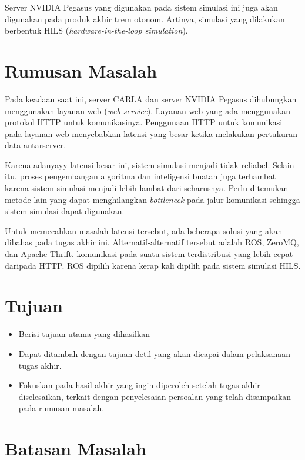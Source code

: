 Server NVIDIA Pegasus yang digunakan pada sistem simulasi ini juga akan
digunakan pada produk akhir trem otonom. Artinya, simulasi yang dilakukan
berbentuk HILS (\textit{hardware-in-the-loop simulation}).

\section{Rumusan Masalah}

Pada keadaan saat ini, server CARLA dan server NVIDIA Pegasus dihubungkan
menggunakan layanan web (\textit{web service}). Layanan web yang ada menggunakan
protokol HTTP untuk komunikasinya. Penggunaan HTTP untuk komunikasi pada layanan
web menyebabkan latensi yang besar ketika melakukan pertukuran data
antarserver.

Karena adanyayy latensi besar ini, sistem simulasi menjadi tidak reliabel.
Selain itu, proses pengembangan algoritma dan inteligensi buatan juga terhambat
karena sistem simulasi menjadi lebih lambat dari seharusnya. Perlu ditemukan
metode lain yang dapat menghilangkan \textit{bottleneck} pada jalur
komunikasi sehingga sistem simulasi dapat digunakan.

Untuk memecahkan masalah latensi tersebut, ada beberapa solusi yang akan dibahas
pada tugas akhir ini. Alternatif-alternatif tersebut adalah ROS, ZeroMQ, dan
Apache Thrift. komunikasi pada suatu sistem terdistribusi yang lebih cepat
daripada HTTP. ROS dipilih karena kerap kali dipilih pada sistem simulasi HILS.

\section{Tujuan}

\begin{itemize}
	\item Berisi tujuan utama yang dihasilkan
	\item Dapat ditambah dengan tujuan detil yang akan dicapai dalam pelaksanaan
	      tugas akhir.
	\item Fokuskan pada hasil akhir yang ingin diperoleh setelah tugas akhir
	      diselesaikan, terkait dengan penyelesaian persoalan yang telah disampaikan
	      pada rumusan masalah.
\end{itemize}

\section{Batasan Masalah}

